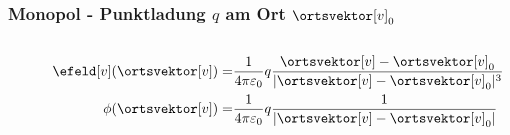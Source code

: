 \begin{frame}

  \frametitle{Monopol - Punktladung $q$ am Ort $\ortsvektor[v]_0$}

  \begin{columns}[T]
    \begin{column}{.3\linewidth}
      
    \end{column}
    \begin{column}{.7\linewidth}
      \begin{align*}
      \efeld[v](\ortsvektor[v]) = & \frac{1}{4\pi\varepsilon_0} q\frac{\ortsvektor[v]-\ortsvektor[v]_0}{|\ortsvektor[v]-\ortsvektor[v]_0|^3} \\
        \phi (\ortsvektor[v]) = & \frac{1}{4\pi\varepsilon_0} q\frac{1}{|\ortsvektor[v]-\ortsvektor[v]_0|}
      \end{align*}
      \end{column}
\end{columns}
\end{frame}

